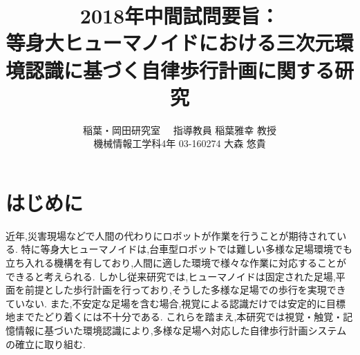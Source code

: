 \documentclass[twocolumn]{preport}
\title{2018年中間試問要旨：\\
等身大ヒューマノイドにおける三次元環境認識に基づく自律歩行計画に関する研究}
\author{稲葉・岡田研究室 　指導教員 稲葉雅幸 教授\\
  機械情報工学科4年 03-160274 大森 悠貴 }
\begin{document}
\pagestyle{empty}
\maketitle
\thispagestyle{empty}
\sloppy

\section{はじめに}



近年,災害現場などで人間の代わりにロボットが作業を行うことが期待されている.
特に等身大ヒューマノイドは,台車型ロボットでは難しい多様な足場環境でも立ち入れる機構を有しており,人間に適した環境で様々な作業に対応することができると考えられる.
しかし従来研究では,ヒューマノイドは固定された足場,平面を前提とした歩行計画を行っており,そうした多様な足場での歩行を実現できていない.
また,不安定な足場を含む場合,視覚による認識だけでは安定的に目標地までたどり着くには不十分である.
これらを踏まえ,本研究では視覚・触覚・記憶情報に基づいた環境認識により,多様な足場へ対応した自律歩行計画システムの確立に取り組む.
\end{document}
